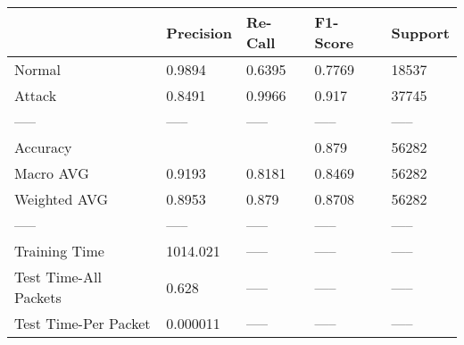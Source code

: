 \begin{tabular}{lllll}
\toprule
{} & Precision & Re-Call & F1-Score & Support \\
\midrule
Normal                &    0.9894 &  0.6395 &   0.7769 &   18537 \\
Attack                &    0.8491 &  0.9966 &    0.917 &   37745 \\
-----                 &     ----- &   ----- &    ----- &   ----- \\
Accuracy              &           &         &    0.879 &   56282 \\
Macro AVG             &    0.9193 &  0.8181 &   0.8469 &   56282 \\
Weighted AVG          &    0.8953 &   0.879 &   0.8708 &   56282 \\
-----                 &     ----- &   ----- &    ----- &   ----- \\
Training Time         &  1014.021 &   ----- &    ----- &   ----- \\
Test Time-All Packets &     0.628 &   ----- &    ----- &   ----- \\
Test Time-Per Packet  &  0.000011 &   ----- &    ----- &   ----- \\
\bottomrule
\end{tabular}
